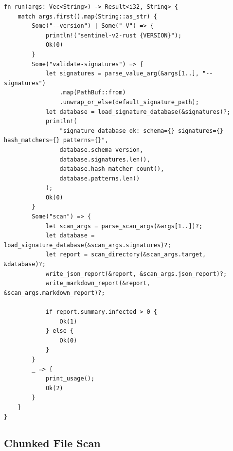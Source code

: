 \documentclass[11pt]{article}
\begin{document}
\begin{lstlisting}[style=sentinel]
fn run(args: Vec<String>) -> Result<i32, String> {
    match args.first().map(String::as_str) {
        Some("--version") | Some("-V") => {
            println!("sentinel-v2-rust {VERSION}");
            Ok(0)
        }
        Some("validate-signatures") => {
            let signatures = parse_value_arg(&args[1..], "--signatures")
                .map(PathBuf::from)
                .unwrap_or_else(default_signature_path);
            let database = load_signature_database(&signatures)?;
            println!(
                "signature database ok: schema={} signatures={} hash_matchers={} patterns={}",
                database.schema_version,
                database.signatures.len(),
                database.hash_matcher_count(),
                database.patterns.len()
            );
            Ok(0)
        }
        Some("scan") => {
            let scan_args = parse_scan_args(&args[1..])?;
            let database = load_signature_database(&scan_args.signatures)?;
            let report = scan_directory(&scan_args.target, &database)?;
            write_json_report(&report, &scan_args.json_report)?;
            write_markdown_report(&report, &scan_args.markdown_report)?;

            if report.summary.infected > 0 {
                Ok(1)
            } else {
                Ok(0)
            }
        }
        _ => {
            print_usage();
            Ok(2)
        }
    }
}
\end{lstlisting}

\subsection{Chunked File Scan}
\end{document}
